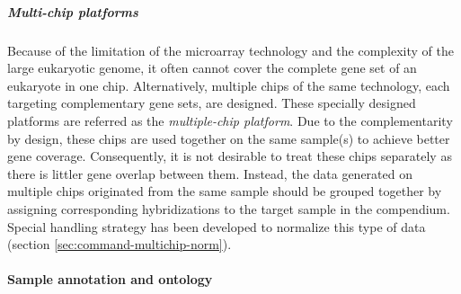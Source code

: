 

\subparagraph{Multi-chip platforms}\label{sec:command-multichip-anno}
Because of the limitation of the microarray technology and the complexity of
the large eukaryotic genome, it often cannot cover the complete gene set of an
eukaryote in one chip.
%
Alternatively, multiple chips of the same technology, each targeting
complementary gene sets, are designed.
%
These specially designed platforms are referred as the \textit{multiple-chip
  platform}.
%
Due to the complementarity by design, these chips are used together on the
same sample(s) to achieve better gene coverage.
%
Consequently, it is not desirable to treat these chips separately as there is
littler gene overlap between them.
%
Instead, the data generated on multiple chips originated from the same sample
should be grouped together by assigning corresponding hybridizations to the
target sample in the compendium.
%
Special handling strategy has been developed to normalize this type of data
(section \ref{sec:command-multichip-norm}).






\paragraph{Sample annotation and ontology}

